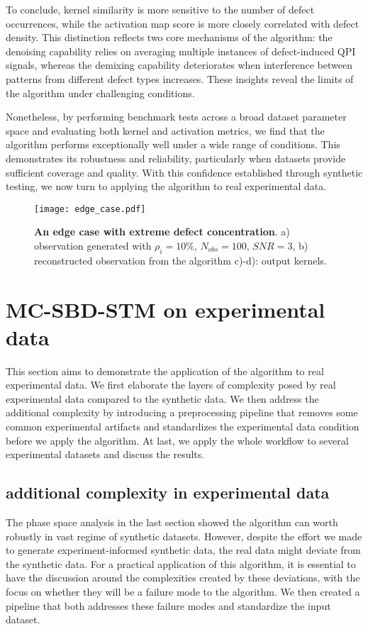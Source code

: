 To conclude, kernel similarity is more sensitive to the number of defect occurrences, while the activation map score is more closely correlated with defect density. This distinction reflects two core mechanisms of the algorithm: the denoising capability relies on averaging multiple instances of defect-induced QPI signals, whereas the demixing capability deteriorates when interference between patterns from different defect types increases. These insights reveal the limits of the algorithm under challenging conditions.

Nonetheless, by performing benchmark tests across a broad dataset parameter space and evaluating both kernel and activation metrics, we find that the algorithm performs exceptionally well under a wide range of conditions. This demonstrates its robustness and reliability, particularly when datasets provide sufficient coverage and quality. With this confidence established through synthetic testing, we now turn to applying the algorithm to real experimental data.

\begin{figure}
	\texttt{[image: edge\_case.pdf]} 
	\centering
	\caption[\textbf{An edge case with extreme defect concentration}]{\textbf{An edge case with extreme defect concentration}. a) observation generated with $\rho_i = 10\%$, $N_{obs}=100$, $SNR=3$, b) reconstructed observation from the algorithm c)-d): output kernels.}
	\label{fig:edge_case}
\end{figure}

\section{MC-SBD-STM on experimental data}
This section aims to demonstrate the application of the algorithm to real experimental data. We first elaborate the layers of complexity posed by real experimental data compared to the synthetic data. We then address the additional complexity by introducing a preprocessing pipeline that removes some common experimental artifacts and standardizes the experimental data condition before we apply the algorithm. At last, we apply the whole workflow to several experimental datasets and discuss the results. 
 
\subsection{additional complexity in experimental data}
The phase space analysis in the last section showed the algorithm can worth robustly in vast regime of synthetic datasets. However, despite the effort we made to generate experiment-informed synthetic data, the real data might deviate from the synthetic data. For a practical application of this algorithm, it is essential to have the discussion around the complexities created by these deviations, with the focus on whether they will be a failure mode to the algorithm. We then created a pipeline that both addresses these failure modes and standardize the input dataset.

